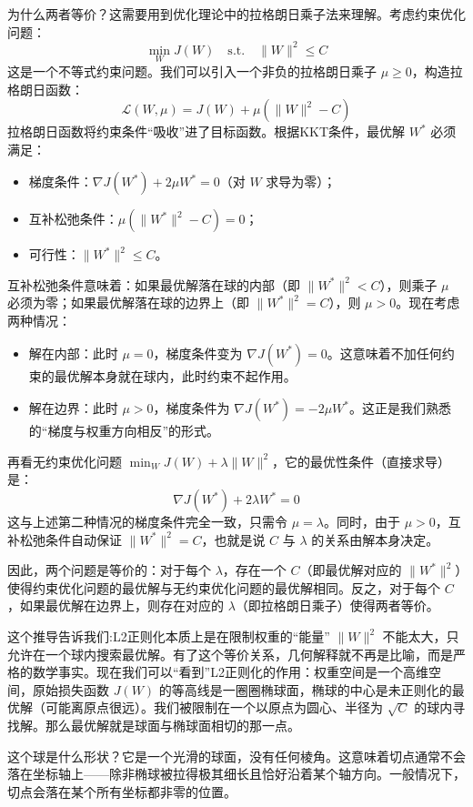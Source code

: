 \documentclass[lang=cn,zihao=-4,a4paper,fontset=windows]{beautybook}
\begin{document}
为什么两者等价？这需要用到优化理论中的拉格朗日乘子法来理解。考虑约束优化问题：
\[
\min_W J(W) \quad \text{s.t.} \quad \|W\|^2 \le C
\]
这是一个不等式约束问题。我们可以引入一个非负的拉格朗日乘子 \(\mu \ge 0\)，构造拉格朗日函数：
\[
\mathcal{L}(W, \mu) = J(W) + \mu (\|W\|^2 - C)
\]
拉格朗日函数将约束条件“吸收”进了目标函数。根据KKT条件，最优解 \(W^*\) 必须满足：
\begin{itemize}
\item 梯度条件：\(\nabla J(W^*) + 2\mu W^* = 0\)（对 \(W\) 求导为零）；
\item 互补松弛条件：\(\mu (\|W^*\|^2 - C) = 0\)；
\item 可行性：\(\|W^*\|^2 \le C\)。
\end{itemize}
互补松弛条件意味着：如果最优解落在球的内部（即 \(\|W^*\|^2 < C\)），则乘子 \(\mu\) 必须为零；如果最优解落在球的边界上（即 \(\|W^*\|^2 = C\)），则 \(\mu > 0\)。现在考虑两种情况：
\begin{itemize}
\item 解在内部：此时 \(\mu = 0\)，梯度条件变为 \(\nabla J(W^*) = 0\)。这意味着不加任何约束的最优解本身就在球内，此时约束不起作用。
\item 解在边界：此时 \(\mu > 0\)，梯度条件为 \(\nabla J(W^*) = -2\mu W^*\)。这正是我们熟悉的“梯度与权重方向相反”的形式。
\end{itemize}
再看无约束优化问题 \(\min_W J(W) + \lambda \|W\|^2\)，它的最优性条件（直接求导）是：
\[
\nabla J(W^*) + 2\lambda W^* = 0
\]
这与上述第二种情况的梯度条件完全一致，只需令 \(\mu = \lambda\)。同时，由于 \(\mu > 0\)，互补松弛条件自动保证 \(\|W^*\|^2 = C\)，也就是说 \(C\) 与 \(\lambda\) 的关系由解本身决定。

因此，两个问题是等价的：对于每个 \(\lambda\)，存在一个 \(C\)（即最优解对应的 \(\|W^*\|^2\)）使得约束优化问题的最优解与无约束优化问题的最优解相同。反之，对于每个 \(C\)，如果最优解在边界上，则存在对应的 \(\lambda\)（即拉格朗日乘子）使得两者等价。

这个推导告诉我们:L2正则化本质上是在限制权重的“能量” \(\|W\|^2\) 不能太大，只允许在一个球内搜索最优解。有了这个等价关系，几何解释就不再是比喻，而是严格的数学事实。现在我们可以“看到”L2正则化的作用：权重空间是一个高维空间，原始损失函数 \(J(W)\) 的等高线是一圈圈椭球面，椭球的中心是未正则化的最优解（可能离原点很远）。我们被限制在一个以原点为圆心、半径为 \(\sqrt{C}\) 的球内寻找解。那么最优解就是球面与椭球面相切的那一点。

这个球是什么形状？它是一个光滑的球面，没有任何棱角。这意味着切点通常不会落在坐标轴上——除非椭球被拉得极其细长且恰好沿着某个轴方向。一般情况下，切点会落在某个所有坐标都非零的位置。
\end{document}
